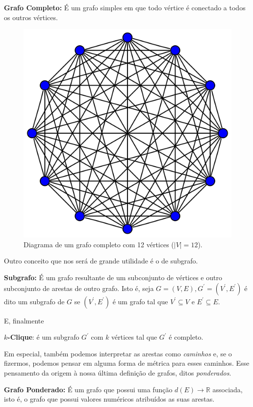 \documentclass[a4paper,12pt]{article}
\begin{document}
\begin{center}
	\begin{minipage}{0.9 \linewidth}
		\textbf{Grafo Completo:} É um grafo simples em que todo vértice é conectado a todos os outros vértices.
	\end{minipage}
\end{center}

\begin{figure}[H]
	\begin{center}
		\includegraphics[width=0.4\linewidth]{grafocompleto.png}
	\end{center}
	\caption{Diagrama de um grafo completo com 12 vértices ($|V| = 12$).}
	\label{fig:grafocompleto}
\end{figure}

Outro conceito que nos será de grande utilidade é o de subgrafo.
\begin{center}
	\begin{minipage}{0.9 \linewidth}
		\textbf{Subgrafo:} É um grafo resultante de um subconjunto de vértices e outro subconjunto de arestas de outro grafo. Isto é, seja $G = (V, E), G^\prime = (V^\prime, E^\prime)$ é dito um subgrafo de $G$ se $(V^\prime, E^\prime)$ é um grafo tal que $V^\prime \subseteq V$ e $E^\prime \subseteq E$.
	\end{minipage}
\end{center}

E, finalmente
\begin{center}
	\begin{minipage}{0.9 \linewidth}
		\textbf{$k$-Clique}: é um subgrafo $G^\prime$ com $k$ vértices tal que $G^\prime$ é completo.
	\end{minipage}
\end{center}

Em especial, também podemos interpretar as arestas como \textit{caminhos} e, se o fizermos, podemos pensar em alguma forma de métrica para esses caminhos. Esse pensamento da origem à nossa última definição de grafos, ditos \textit{ponderados}.

\begin{center}
	\begin{minipage}{0.9 \linewidth}
		\textbf{Grafo Ponderado:} É um grafo que possui uma função $d(E) \rightarrow \mathbb{R}$ associada, isto é, o grafo que possui valores numéricos atribuídos as suas arestas.
	\end{minipage}
\end{center}

{}



\end{document}
